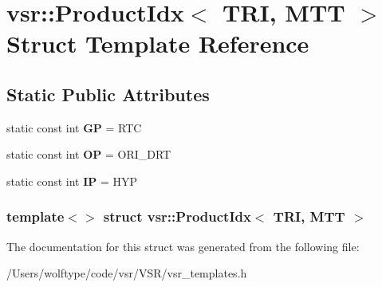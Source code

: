 \hypertarget{structvsr_1_1_product_idx_3_01_t_r_i_00_01_m_t_t_01_4}{\section{vsr\-:\-:Product\-Idx$<$ T\-R\-I, M\-T\-T $>$ Struct Template Reference}
\label{structvsr_1_1_product_idx_3_01_t_r_i_00_01_m_t_t_01_4}
}
\subsection*{Static Public Attributes}
\begin{DoxyCompactItemize}
\item 
\hypertarget{structvsr_1_1_product_idx_3_01_t_r_i_00_01_m_t_t_01_4_ab80ef87f1ea90116f0a91fe925fb9624}{static const int {\bfseries G\-P} = R\-T\-C}\label{structvsr_1_1_product_idx_3_01_t_r_i_00_01_m_t_t_01_4_ab80ef87f1ea90116f0a91fe925fb9624}

\item 
\hypertarget{structvsr_1_1_product_idx_3_01_t_r_i_00_01_m_t_t_01_4_a99ad7c44068e479e19ab4004894154e0}{static const int {\bfseries O\-P} = O\-R\-I\-\_\-\-D\-R\-T}\label{structvsr_1_1_product_idx_3_01_t_r_i_00_01_m_t_t_01_4_a99ad7c44068e479e19ab4004894154e0}

\item 
\hypertarget{structvsr_1_1_product_idx_3_01_t_r_i_00_01_m_t_t_01_4_a54410274b2b1dd81fa65f30139009274}{static const int {\bfseries I\-P} = H\-Y\-P}\label{structvsr_1_1_product_idx_3_01_t_r_i_00_01_m_t_t_01_4_a54410274b2b1dd81fa65f30139009274}

\end{DoxyCompactItemize}
\subsubsection*{template$<$$>$ struct vsr\-::\-Product\-Idx$<$ T\-R\-I, M\-T\-T $>$}



The documentation for this struct was generated from the following file\-:\begin{DoxyCompactItemize}
\item 
/\-Users/wolftype/code/vsr/\-V\-S\-R/vsr\-\_\-templates.\-h\end{DoxyCompactItemize}
